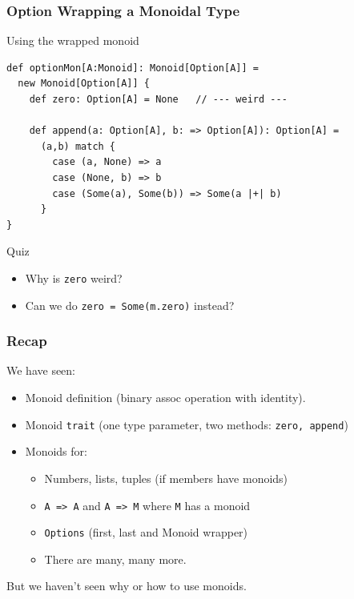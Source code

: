 \documentclass{beamer}
\begin{document}
\begin{frame}[fragile]
  \frametitle{Option Wrapping a Monoidal Type}
  \begin{block}{Using the wrapped monoid}
  \begin{lstlisting}
def optionMon[A:Monoid]: Monoid[Option[A]] =
  new Monoid[Option[A]] {
    def zero: Option[A] = None   // --- weird ---

    def append(a: Option[A], b: => Option[A]): Option[A] =
      (a,b) match {
        case (a, None) => a
        case (None, b) => b
        case (Some(a), Some(b)) => Some(a |+| b)
      }
}
  \end{lstlisting}
  \end{block}

  \begin{block}{Quiz}
    \begin{itemize}
      \item Why is \texttt{zero} weird?
      \item Can we do \texttt{zero = Some(m.zero)} instead?
    \end{itemize}
  \end{block}
\end{frame}

\begin{frame} \frametitle{Recap}
  We have seen:
  \begin{itemize}
    \item Monoid definition (binary assoc operation with identity).
    \item Monoid \texttt{trait} (one type parameter,
      two methods: \texttt{zero, append})
    \item Monoids for:
      \begin{itemize}
      \item Numbers, lists, tuples (if members have monoids)
      \item \texttt{A => A} and \texttt{A => M} where \texttt{M} has a monoid
      \item \texttt{Options} (first, last and Monoid wrapper)
      \item There are many, many more.
      \end{itemize}
  \end{itemize}

  \begin{block}{}
    \centering
    But we haven't seen \alert{why} or \alert{how} to use monoids.
  \end{block}
\end{frame}
\end{document}
